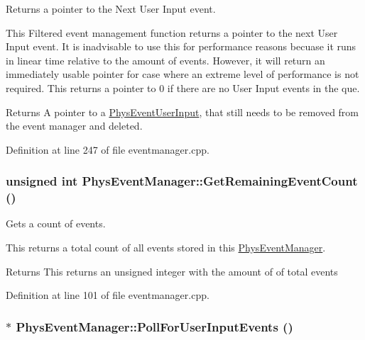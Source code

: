 Returns a pointer to the Next User Input event. 

This Filtered event management function returns a pointer to the next User Input event. It is inadvisable to use this for performance reasons becuase it runs in linear time relative to the amount of events. However, it will return an immediately usable pointer for case where an extreme level of performance is not required. This returns a pointer to 0 if there are no User Input events in the que. \begin{DoxyReturn}{Returns}
A pointer to a \hyperlink{classPhysEventUserInput}{PhysEventUserInput}, that still needs to be removed from the event manager and deleted. 
\end{DoxyReturn}


Definition at line 247 of file eventmanager.cpp.

\hypertarget{classPhysEventManager_ab14d238e7abe9919be8e2d9eef388b64}{
\subsubsection[{GetRemainingEventCount}]{\setlength{\rightskip}{0pt plus 5cm}unsigned int PhysEventManager::GetRemainingEventCount ()}}
\label{d5/dd7/classPhysEventManager_ab14d238e7abe9919be8e2d9eef388b64}


Gets a count of events. 

This returns a total count of all events stored in this \hyperlink{classPhysEventManager}{PhysEventManager}. \begin{DoxyReturn}{Returns}
This returns an unsigned integer with the amount of of total events 
\end{DoxyReturn}


Definition at line 101 of file eventmanager.cpp.

\hypertarget{classPhysEventManager_ac66ebe495e2a77d06803291711528db2}{
\subsubsection[{PollForUserInputEvents}]{ $\ast$ PhysEventManager::PollForUserInputEvents ()}}
\label{d5/dd7/classPhysEventManager_ac66ebe495e2a77d06803291711528db2}


